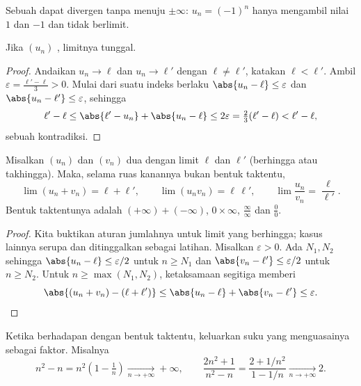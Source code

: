 \begin{remark}
Sebuah  dapat divergen tanpa menuju $\pm\infty$: 
$u_n = (-1)^n$ hanya mengambil nilai $1$ dan $-1$ dan tidak berlimit.
\end{remark}

\begin{proposition}\label{prop:g12:seq:uniqueness}
Jika $(u_n)$ , limitnya tunggal.
\end{proposition}

\begin{proof}
Andaikan $u_n \to \ell$ dan $u_n \to \ell'$ dengan $\ell \neq \ell'$, katakan
$\ell < \ell'$. Ambil $\varepsilon = \frac{\ell' - \ell}{3} > 0$. Mulai dari
suatu indeks berlaku $\abs{u_n - \ell} \leq \varepsilon$ dan
$\abs{u_n - \ell'} \leq \varepsilon$, sehingga
\[
\ell' - \ell \leq \abs{\ell' - u_n} + \abs{u_n - \ell}
\leq 2\varepsilon = \tfrac{2}{3}(\ell' - \ell) < \ell' - \ell,
\]
sebuah kontradiksi.
\end{proof}

\begin{proposition}\label{prop:g12:seq:operations}
Misalkan $(u_n)$ dan $(v_n)$ dua  dengan limit $\ell$ dan $\ell'$
(berhingga atau takhingga). Maka, selama ruas kanannya bukan bentuk taktentu,
\[
\lim (u_n + v_n) = \ell + \ell', \qquad
\lim (u_n v_n) = \ell\,\ell', \qquad
\lim \frac{u_n}{v_n} = \frac{\ell}{\ell'}.
\]
Bentuk taktentunya adalah
$(+\infty) + (-\infty)$, $0 \times \infty$, $\frac{\infty}{\infty}$ dan
$\frac{0}{0}$.
\end{proposition}

\begin{proof}
Kita buktikan aturan jumlahnya untuk limit yang berhingga; kasus lainnya serupa
dan ditinggalkan sebagai latihan. Misalkan $\varepsilon > 0$. Ada $N_1, N_2$
sehingga $\abs{u_n - \ell} \leq \varepsilon/2$ untuk $n \geq N_1$ dan
$\abs{v_n - \ell'} \leq \varepsilon/2$ untuk $n \geq N_2$. Untuk
$n \geq \max(N_1, N_2)$, ketaksamaan segitiga memberi
\[
\abs{(u_n + v_n) - (\ell + \ell')}
\leq \abs{u_n - \ell} + \abs{v_n - \ell'} \leq \varepsilon. \qedhere
\]
\end{proof}

\begin{method}\label{met:g12:seq:indeterminate}
Ketika berhadapan dengan bentuk taktentu, keluarkan suku yang menguasainya sebagai faktor. Misalnya
\[
n^2 - n = n^2\left(1 - \tfrac{1}{n}\right) \xrightarrow[n\to+\infty]{} +\infty,
\qquad
\frac{2n^2+1}{n^2 - n} = \frac{2 + 1/n^2}{1 - 1/n}
\xrightarrow[n\to+\infty]{} 2 .
\]
\end{method}

